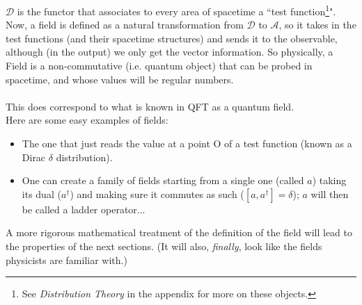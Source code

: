 \documentclass[a4paper,11pt]{article}
\numberwithin{equation}{section}
\theoremstyle{definition}
\begin{document}
$\mathcal{D}$ is the functor that associates to every area of spacetime a ``test function\footnote{See \textit{Distribution Theory} in the appendix for more on these objects.}". Now, a field is defined as a natural transformation from $\mathcal{D}$ to $\mathcal{A}$, so it takes in the test functions (and their spacetime structures) and sends it to the observable, although (in the output) we only get the vector information. So physically, a Field is a non-commutative (i.e. quantum object) that can be probed in spacetime, and whose values will be regular numbers.\\ \\
This does correspond to what is known in QFT as a quantum field.\\

\noindent Here are some easy examples of fields:
\begin{itemize}
    \item The one that just reads the value at a point O of a test function (known as a Dirac $\delta$ distribution).
    \item One can create a family of fields starting from a single one (called $a$) taking its dual ($a^\dag$) and making sure it commutes as such ($[a,a^\dag]=\delta$); $a$ will then be called a ladder operator...
\end{itemize}

A more rigorous mathematical treatment of the definition of the field will lead to the properties of the next sections. (It will also, \emph{finally}, look like the fields physicists are familiar with.)
\end{document}
